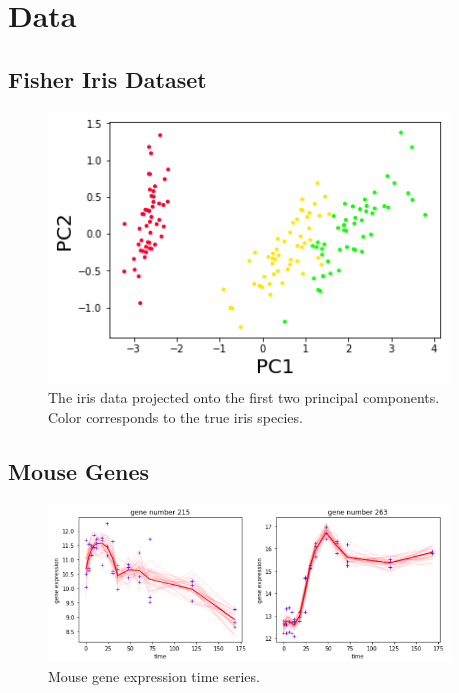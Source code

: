 \documentclass[a0,plainsections,30pt]{sciposter}\usepackage[]{graphicx}\usepackage[]{color}
\begin{document}
\hfill \vrule \hfill
\begin{minipage}[t]{0.45\textwidth}




\section*{Data}

\subsection*{Fisher Iris Dataset}
\begin{figure}[!h]
\centering
\includegraphics[width = 0.95\textwidth]{./static_images/iris_data.png}
\caption{The iris data projected onto the first two principal components. Color corresponds to the true iris species.}
\setlength{\textfloatsep}{-10pt}
\end{figure}

\subsection*{Mouse Genes}
\begin{figure}[!h]
\centering
\includegraphics[width = 0.95\textwidth]{./static_images/mouse_genes.png}
\caption{Mouse gene expression time series.}
\setlength{\textfloatsep}{-10pt}
\end{figure}


\end{minipage}
\end{document}
